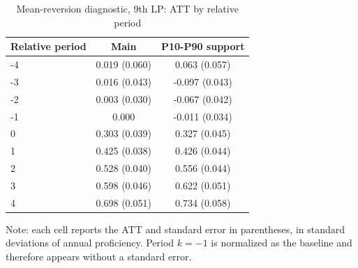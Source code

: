 ﻿\begin{table}[!htbp]
\centering
\caption{Mean-reversion diagnostic, 9th LP: ATT by relative period}
\label{tab:ap_event_regmedia_9th_lp}
\vspace{-0.15cm}
\scriptsize
\setlength{\tabcolsep}{4pt}
\renewcommand{\arraystretch}{0.92}
\begin{tabular}{lcc}
\toprule
Relative period & Main & P10-P90 support \\
\midrule
-4 & 0.019 (0.060) & 0.063 (0.057) \\
-3 & 0.016 (0.043) & -0.097 (0.043) \\
-2 & 0.003 (0.030) & -0.067 (0.042) \\
-1 & 0.000 & -0.011 (0.034) \\
0 & 0.303 (0.039) & 0.327 (0.045) \\
1 & 0.425 (0.038) & 0.426 (0.044) \\
2 & 0.528 (0.040) & 0.556 (0.044) \\
3 & 0.598 (0.046) & 0.622 (0.051) \\
4 & 0.698 (0.051) & 0.734 (0.058) \\
\bottomrule
\end{tabular}
\begin{flushleft}
\footnotesize Note: each cell reports the ATT and standard error in parentheses, in standard deviations of annual proficiency. Period \(k=-1\) is normalized as the baseline and therefore appears without a standard error.
\end{flushleft}
\end{table}




